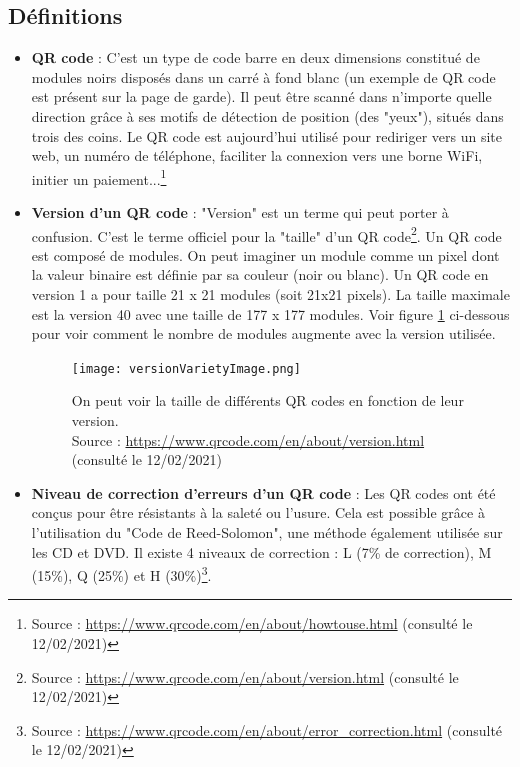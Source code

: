 \documentclass[a4paper,12pt]{article}
\begin{document}
\subsection{Définitions}
\begin{itemize}

    \item \textbf{QR code} : C'est un type de code barre en deux dimensions constitué de modules noirs disposés dans un carré à fond blanc (un exemple de QR code est présent sur la page de garde). Il peut être scanné dans n'importe quelle direction grâce à ses motifs de détection de position (des "yeux"), situés dans trois des coins. Le QR code est aujourd'hui utilisé pour rediriger vers un site web, un numéro de téléphone, faciliter la connexion vers une borne WiFi, initier un paiement...\footnote{Source : \url{https://www.qrcode.com/en/about/howtouse.html} (consulté le 12/02/2021)}\\

    \item \textbf{Version d'un QR code} : "Version" est un terme qui peut porter à confusion. C'est le terme officiel pour la "taille" d'un QR code\footnote{Source : \url{https://www.qrcode.com/en/about/version.html} (consulté le 12/02/2021)}. Un QR code est composé de modules. On peut imaginer un module comme un pixel dont la valeur binaire est définie par sa couleur (noir ou blanc). Un QR code en version 1 a pour taille 21 x 21 modules (soit 21x21 pixels). La taille maximale est la version 40 avec une taille de 177 x 177 modules. Voir figure \ref{fig:versionQR} ci-dessous pour voir comment le nombre de modules augmente avec la version utilisée.\\
    
    \begin{figure}[H]
        \begin{center}
            \texttt{[image: versionVarietyImage.png]}
            \caption{On peut voir la taille de différents QR codes en fonction de leur version.\\Source : \url{https://www.qrcode.com/en/about/version.html} (consulté le 12/02/2021)}
            \label{fig:versionQR}
        \end{center}
    \end{figure}
    
    \item \textbf{Niveau de correction d'erreurs d'un QR code} : Les QR codes ont été conçus pour être résistants à la saleté ou l'usure. Cela est possible grâce à l'utilisation du "Code de Reed-Solomon", une méthode également utilisée sur les CD et DVD. Il existe 4 niveaux de correction : L (7\% de correction), M (15\%), Q (25\%) et H (30\%)\footnote{Source : \url{https://www.qrcode.com/en/about/error_correction.html} (consulté le 12/02/2021)}.\\
    

\end{itemize}
\end{document}
